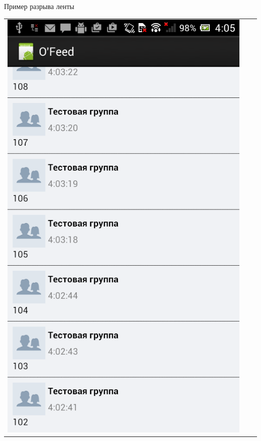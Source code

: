 \documentclass[utf8,xcolor=table]{beamer}
\begin{document}
\begin{frame}[t]{Пример разрыва ленты}
\begin{center}
\begin{tabular}{ccc}
			\includegraphics[scale=0.18]{c.png}
		\end{tabular}
	\end{center}
\end{frame}
\end{document}
